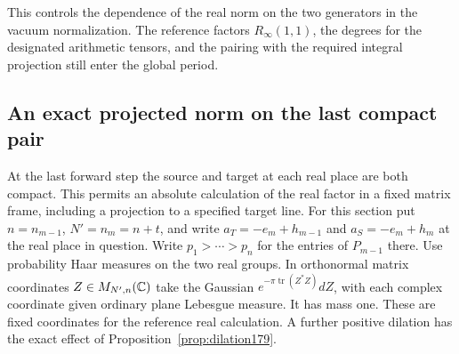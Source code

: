 \documentclass[a4paper,11pt]{article}
\theoremstyle{definition}
\theoremstyle{remark}
\numberwithin{equation}{section}
\begin{document}
This controls the dependence of the real norm on the two
generators in the vacuum normalization. The reference factors
\(R_\infty(1,1)\), the degrees for the designated arithmetic
tensors, and the pairing with the required integral projection
still enter the global period.

\subsection{An exact projected norm on the last compact pair}\label{nav:VIII-09}
\label{sec:last181}

At the last forward step the source and target at each real
place are both compact. This permits an absolute calculation
of the real factor in a fixed matrix frame, including a
projection to a specified target line. For this section put
\(n=n_{m-1}\), \(N'=n_m=n+t\), and write \(a_T=-e_m+h_{m-1}\)
and \(a_S=-e_m+h_m\) at the real place in question. Write
\(p_1>\cdots>p_n\) for the entries of \(P_{m-1}\) there.
Use probability Haar measures on the two real groups. In
orthonormal matrix coordinates \(Z\in M_{N',n}(\mathbb C)\) take
the Gaussian \(e^{-\pi\operatorname{tr}(Z^*Z)}dZ\), with
each complex coordinate given ordinary plane Lebesgue measure.
It has mass one. These are fixed coordinates for the reference
real calculation. A further positive dilation has the exact
effect of Proposition~\ref{prop:dilation179}.
\end{document}
